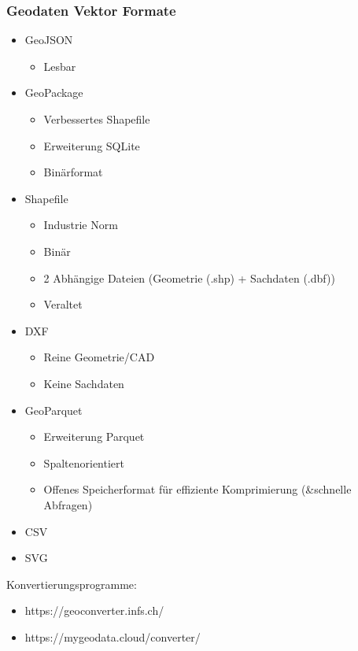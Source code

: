 \documentclass[../Main.tex]{subfiles}
\begin{document}
\subsubsection{Geodaten Vektor Formate}
\begin{itemize}
    \item GeoJSON
        \begin{itemize}
            \item Lesbar
        \end{itemize}
    \item GeoPackage
        \begin{itemize}
            \item Verbessertes Shapefile
            \item Erweiterung SQLite
            \item Binärformat
        \end{itemize}
    \item Shapefile
        \begin{itemize}
            \item Industrie Norm
            \item Binär
            \item 2 Abhängige Dateien (Geometrie (.shp) + Sachdaten (.dbf))
            \item Veraltet
        \end{itemize}
    \item DXF
        \begin{itemize}
            \item Reine Geometrie/CAD
            \item Keine Sachdaten
        \end{itemize}
    \item GeoParquet
        \begin{itemize}
            \item Erweiterung Parquet
            \item Spaltenorientiert
            \item Offenes Speicherformat für effiziente Komprimierung (\&schnelle Abfragen)
        \end{itemize}
    \item CSV
    \item SVG
\end{itemize}
Konvertierungsprogramme:
\begin{itemize}
    \item https://geoconverter.infs.ch/
    \item https://mygeodata.cloud/converter/
\end{itemize}
\end{document}
